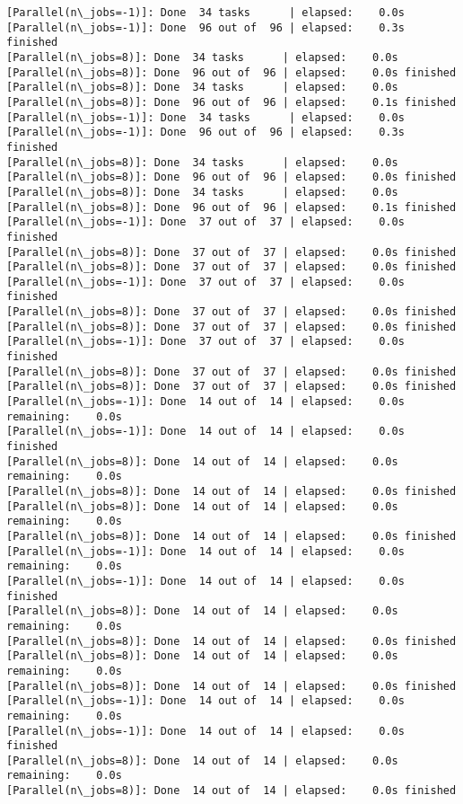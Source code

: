 \documentclass[11pt]{article}
\begin{document}
\begin{Verbatim}[commandchars=\\\{\}]
[Parallel(n\_jobs=-1)]: Done  34 tasks      | elapsed:    0.0s
[Parallel(n\_jobs=-1)]: Done  96 out of  96 | elapsed:    0.3s finished
[Parallel(n\_jobs=8)]: Done  34 tasks      | elapsed:    0.0s
[Parallel(n\_jobs=8)]: Done  96 out of  96 | elapsed:    0.0s finished
[Parallel(n\_jobs=8)]: Done  34 tasks      | elapsed:    0.0s
[Parallel(n\_jobs=8)]: Done  96 out of  96 | elapsed:    0.1s finished
[Parallel(n\_jobs=-1)]: Done  34 tasks      | elapsed:    0.0s
[Parallel(n\_jobs=-1)]: Done  96 out of  96 | elapsed:    0.3s finished
[Parallel(n\_jobs=8)]: Done  34 tasks      | elapsed:    0.0s
[Parallel(n\_jobs=8)]: Done  96 out of  96 | elapsed:    0.0s finished
[Parallel(n\_jobs=8)]: Done  34 tasks      | elapsed:    0.0s
[Parallel(n\_jobs=8)]: Done  96 out of  96 | elapsed:    0.1s finished
[Parallel(n\_jobs=-1)]: Done  37 out of  37 | elapsed:    0.0s finished
[Parallel(n\_jobs=8)]: Done  37 out of  37 | elapsed:    0.0s finished
[Parallel(n\_jobs=8)]: Done  37 out of  37 | elapsed:    0.0s finished
[Parallel(n\_jobs=-1)]: Done  37 out of  37 | elapsed:    0.0s finished
[Parallel(n\_jobs=8)]: Done  37 out of  37 | elapsed:    0.0s finished
[Parallel(n\_jobs=8)]: Done  37 out of  37 | elapsed:    0.0s finished
[Parallel(n\_jobs=-1)]: Done  37 out of  37 | elapsed:    0.0s finished
[Parallel(n\_jobs=8)]: Done  37 out of  37 | elapsed:    0.0s finished
[Parallel(n\_jobs=8)]: Done  37 out of  37 | elapsed:    0.0s finished
[Parallel(n\_jobs=-1)]: Done  14 out of  14 | elapsed:    0.0s remaining:    0.0s
[Parallel(n\_jobs=-1)]: Done  14 out of  14 | elapsed:    0.0s finished
[Parallel(n\_jobs=8)]: Done  14 out of  14 | elapsed:    0.0s remaining:    0.0s
[Parallel(n\_jobs=8)]: Done  14 out of  14 | elapsed:    0.0s finished
[Parallel(n\_jobs=8)]: Done  14 out of  14 | elapsed:    0.0s remaining:    0.0s
[Parallel(n\_jobs=8)]: Done  14 out of  14 | elapsed:    0.0s finished
[Parallel(n\_jobs=-1)]: Done  14 out of  14 | elapsed:    0.0s remaining:    0.0s
[Parallel(n\_jobs=-1)]: Done  14 out of  14 | elapsed:    0.0s finished
[Parallel(n\_jobs=8)]: Done  14 out of  14 | elapsed:    0.0s remaining:    0.0s
[Parallel(n\_jobs=8)]: Done  14 out of  14 | elapsed:    0.0s finished
[Parallel(n\_jobs=8)]: Done  14 out of  14 | elapsed:    0.0s remaining:    0.0s
[Parallel(n\_jobs=8)]: Done  14 out of  14 | elapsed:    0.0s finished
[Parallel(n\_jobs=-1)]: Done  14 out of  14 | elapsed:    0.0s remaining:    0.0s
[Parallel(n\_jobs=-1)]: Done  14 out of  14 | elapsed:    0.0s finished
[Parallel(n\_jobs=8)]: Done  14 out of  14 | elapsed:    0.0s remaining:    0.0s
[Parallel(n\_jobs=8)]: Done  14 out of  14 | elapsed:    0.0s finished

\end{Verbatim}
\end{document}
